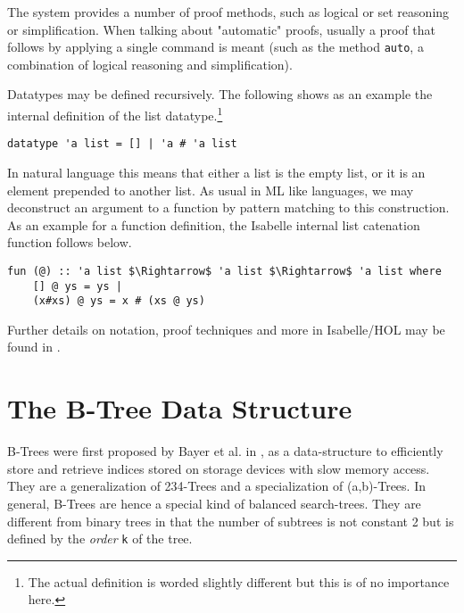 The system provides a number of proof methods,
such as logical or set reasoning or simplification.
When talking about "automatic" proofs, usually a proof that follows
by applying a single command is meant (such as the method \texttt{auto},
a combination of logical reasoning and simplification).

Datatypes may be defined recursively.
The following shows as an example the internal definition of the list datatype.\footnote{
    The actual definition is worded slightly different but this is of no importance here.
}

\begin{lstlisting}[mathescape=true, language=Isabelle,label=lst:list-def]
datatype 'a list = [] | 'a # 'a list
\end{lstlisting}

In natural language this means that either a list is the empty list,
or it is an element prepended to another list.
As usual in ML like languages, we may deconstruct an argument to a function
by pattern matching to this construction.
As an example for a function definition,
the Isabelle internal list catenation function follows below.

\begin{lstlisting}[mathescape=true, language=Isabelle,label=lst:append-def]
fun (@) :: 'a list $\Rightarrow$ 'a list $\Rightarrow$ 'a list where
    [] @ ys = ys |
    (x#xs) @ ys = x # (xs @ ys)
\end{lstlisting}

Further details on notation, proof techniques and more in Isabelle/HOL
may be found in \parencite{DBLP:books/sp/NipkowPW02}.


\section{The B-Tree Data Structure}

B-Trees were first proposed by Bayer et al. in \parencite{DBLP:journals/acta/BayerM72},
as a data-structure to efficiently store and retrieve indices stored on storage devices
with slow memory access.
They are a generalization of 234-Trees and a specialization of (a,b)-Trees. %
In general, B-Trees are hence a special kind of balanced search-trees.
They are different from binary trees in that the number of subtrees is not constant 2
but is defined by the \textit{order} \texttt{k} of the tree.

